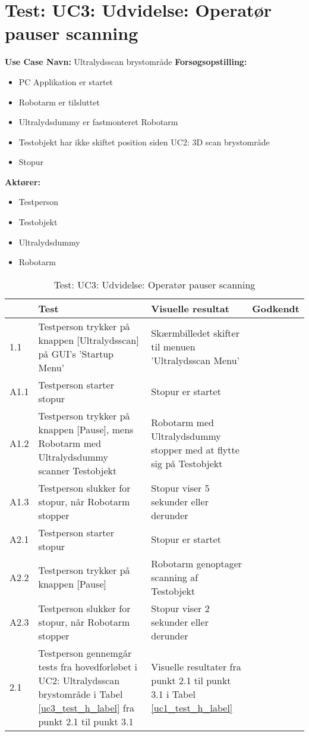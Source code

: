 
\section{Test: UC3: Udvidelse: Operatør pauser scanning}
\textbf{Use Case Navn:} Ultralydsscan brystområde \newline
\textbf{Forsøgsopstilling:}
\begin{itemize}
\item PC Applikation er startet
\item Robotarm er tilsluttet
\item Ultralydsdummy er fastmonteret Robotarm
\item Testobjekt har ikke skiftet position siden UC2: 3D scan brystområde
\item Stopur
\end{itemize}  
\textbf{Aktører:}
\begin{itemize}
\item Testperson
\item Testobjekt
\item Ultralydsdummy
\item Robotarm
\end{itemize}  

\begin{table}[htb]
\begin{tabularx}{\textwidth}{|p{0.7cm}|X|X|p{2cm}|}
\hline
\textbf{} & \textbf{Test} & \textbf{Visuelle resultat} &\textbf{Godkendt} \\ \hline
1.1 & Testperson trykker på knappen [Ultralydsscan] på GUI's 'Startup Menu' & Skærmbilledet skifter til menuen 'Ultralydsscan Menu' & \\ \hline
A1.1 & Testperson starter stopur & Stopur er startet & \\\hline
A1.2 & Testperson trykker på knappen [Pause], mens Robotarm med Ultralydsdummy scanner Testobjekt & Robotarm med Ultralydsdummy stopper med at flytte sig på Testobjekt & \\\hline
A1.3 & Testperson slukker for stopur, når Robotarm stopper & Stopur viser 5 sekunder eller derunder & \\\hline
A2.1 & Testperson starter stopur & Stopur er startet & \\\hline
A2.2 & Testperson trykker på knappen [Pause] & Robotarm genoptager scanning af Testobjekt & \\\hline 
A2.3 & Testperson slukker for stopur, når Robotarm stopper & Stopur viser 2 sekunder eller derunder & \\\hline
2.1 & Testperson gennemgår tests fra hovedforløbet i UC2: Ultralydsscan brystområde i Tabel \ref{uc3_test_h_label} fra punkt 2.1 til punkt 3.1  & Visuelle resultater fra punkt 2.1 til punkt 3.1 i Tabel \ref{uc1_test_h_label} & \\ \hline
\end{tabularx}
    \caption{Test: UC3: Udvidelse: Operatør pauser scanning} 
    \label{uc3_test_e_1_label}  
\end{table}
\newpage

